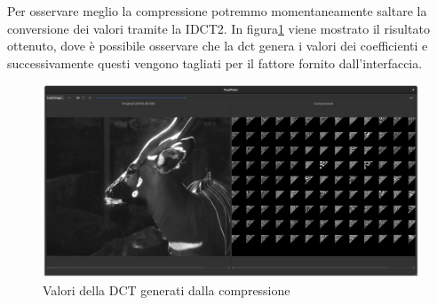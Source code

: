 Per osservare meglio la compressione potremmo momentaneamente saltare la conversione dei valori tramite la IDCT2. In figura\ref{fig:compression_values} viene mostrato il risultato ottenuto, dove è possibile osservare che la dct genera i valori dei coefficienti e successivamente questi vengono tagliati per il fattore fornito dall'interfaccia.

\begin{figure}[h]
	\centering
	\includegraphics[width=1\linewidth]{figures/qt_dct_values}
	\caption{Valori della DCT generati dalla compressione}
	\label{fig:compression_values}
\end{figure}
